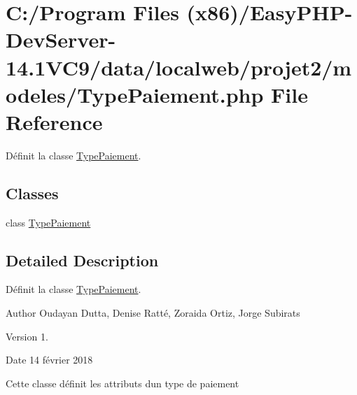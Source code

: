 \hypertarget{_type_paiement_8php}{}\section{C\+:/\+Program Files (x86)/\+Easy\+P\+H\+P-\/\+Dev\+Server-\/14.1\+V\+C9/data/localweb/projet2/modeles/\+Type\+Paiement.php File Reference}
\label{_type_paiement_8php}


Définit la classe \hyperlink{class_type_paiement}{Type\+Paiement}.  


\subsection*{Classes}
\begin{DoxyCompactItemize}
\item 
class \hyperlink{class_type_paiement}{Type\+Paiement}
\end{DoxyCompactItemize}


\subsection{Detailed Description}
Définit la classe \hyperlink{class_type_paiement}{Type\+Paiement}. 

\begin{DoxyAuthor}{Author}
Oudayan Dutta, Denise Ratté, Zoraida Ortiz, Jorge Subirats 
\end{DoxyAuthor}
\begin{DoxyVersion}{Version}
1. 
\end{DoxyVersion}
\begin{DoxyDate}{Date}
14 février 2018
\end{DoxyDate}
Cette classe définit les attributs d\textquotesingle{}un type de paiement 